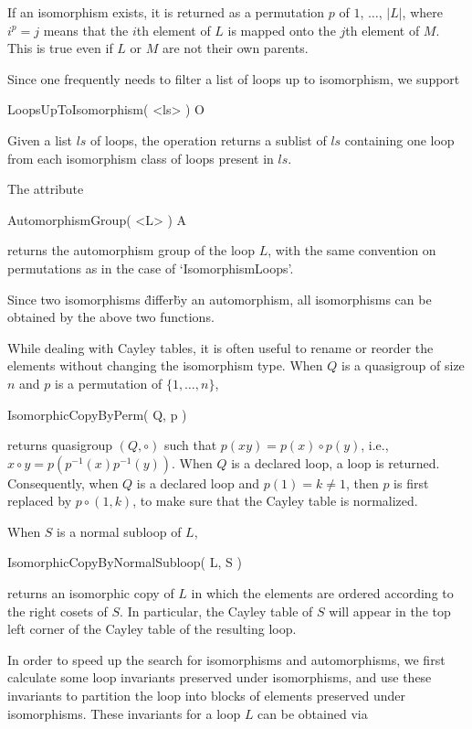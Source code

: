 If an isomorphism exists, it is returned as a permutation $p$ of $1$, $\dots$,
$|L|$, where $i^p=j$ means that the $i$th element of $L$ is mapped onto the
$j$th element of $M$. This is true even if $L$ or $M$ are not their own
parents.

Since one frequently needs to filter a list of loops up to isomorphism, we
support

\>LoopsUpToIsomorphism( <ls> ) O

Given a list $ls$ of loops, the operation returns a sublist of $ls$ containing
one loop from each isomorphism class of loops present in $ls$.

The attribute

\>AutomorphismGroup( <L> ) A

returns the automorphism group of the loop $L$, with the same convention on
permutations as in the case of `IsomorphismLoops'.

Since two isomorphisms \"differ\" by an automorphism, all isomorphisms can be
obtained by the above two functions.

While dealing with Cayley tables, it is often useful to rename or reorder the
elements without changing the isomorphism type. When $Q$ is a quasigroup of
size $n$ and $p$ is a permutation of $\{1,\dots,n\}$,

\>IsomorphicCopyByPerm( Q, p )

returns quasigroup $(Q,\circ)$ such that $p(xy) = p(x)\circ p(y)$, i.e.,
$x\circ y = p( p^{-1}(x)p^{-1}(y))$. When $Q$ is a declared loop, a loop is
returned. Consequently, when $Q$ is a declared loop and $p(1) = k\ne 1$, then
$p$ is first replaced by $p\circ (1,k)$, to make sure that the Cayley table is
normalized.

When $S$ is a normal subloop of $L$,

\>IsomorphicCopyByNormalSubloop( L, S )

returns an isomorphic copy of $L$ in which the elements are ordered according
to the right cosets of $S$. In particular, the Cayley table of $S$ will appear
in the top left corner of the Cayley table of the resulting loop.


In order to speed up the search for isomorphisms and automorphisms, we first
calculate some loop invariants preserved under isomorphisms, and use these
invariants to partition the loop into blocks of elements preserved under
isomorphisms. These invariants for a loop $L$ can be obtained via

